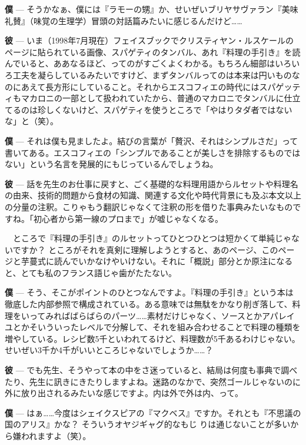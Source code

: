 \documentclass[14Q,]{ltjsbook}
\renewcommand{\ldots}{\noindent…}
\renewcommand{\kenten}[1]{#1}
\begin{document}
\textbf{僕} ---
そうかなぁ、僕には『ラモーの甥』か、せいぜいブリヤサヴァラン『美味礼賛』（味覚の生理学）冒頭の対話篇みたいに感じるんだけど\ldots{}\ldots{}

\textbf{彼} ---
いま（1998年7月現在）フェイスブックでクリスティヤン・ルスケールのページに貼られている画像、スパゲティのタンバル、あれ『料理の手引き』を読んでいると、ああなるほど、ってのがすごくよくわかる。もちろん細部はいろいろ工夫を凝らしているみたいですけど、まずタンバルってのは本来は円いものなのにあえて長方形にしていること。それからエスコフィエの時代にはスパゲッティもマカロニの一部として扱われていたから、普通のマカロニでタンバルに仕立てるのは珍しくないけど、スパゲティを使うところで「やはりタダ者ではないな」と（笑）。

\textbf{僕} ---
それは僕も見ましたよ。結びの言葉が「贅沢、それはシンプルさだ」って書いてある。エスコフィエの「シンプルであることが美しさを排除するものではない」という名言を発展的にもじっているんでしょうね。

\textbf{彼} ---
話を先生のお仕事に戻すと、ごく基礎的な料理用語からルセットや料理名の由来、技術的問題から食材の知識、関連する文化や時代背景にも及ぶ本文以上の分量の注釈。こりゃもう\kenten{翻訳}じゃなくて注釈の形を借りた\kenten{事典}みたいなものですね。「初心者から第一線のプロまで」が嘘じゃなくなる。

　ところで『料理の手引き』のルセットってひとつひとつは短かくて単純じゃないですか？
ところがそれを真剣に理解しようとすると、あのページ、このページと芋蔓式に読んでいかなけやいけない。それに「概説」部分とか原注になると、とても私のフランス語じゃ歯がたたない。

\textbf{僕} ---
そう、そこがポイントのひとつなんですよ。『料理の手引き』という本は徹底した内部参照で構成されている。ある意味では無駄をかなり削ぎ落して、料理をいってみればばらばらのパーツ\ldots{}\ldots{}素材だけじゃなく、ソースとかアパレイユとかそいういったレベルで分解して、それを組み合わせることで料理の種類を増やしている。レシピ数5千といわれてるけど、料理数が5千あるわけじゃない。せいぜい3千か4千がいいところじゃないでしょうか\ldots{}\ldots{}？

\textbf{彼} ---
でも先生、そうやって本の中をさ迷っていると、結局は何度も事典で調べたり、先生に訊きにきたりしますよね。迷路のなかで、突然ゴールじゃないのに外に放り出されるみたいな感じですよ。内は外で外は内、って。

\textbf{僕} ---
はぁ\ldots{}\ldots{}今度はシェイクスピアの『マクベス』ですか。それとも『不思議の国のアリス』かな？
そういうオヤジギャグ的な\kenten{もじ
    り}は通じないことが多いから嫌われますよ（笑）。
\end{document}
